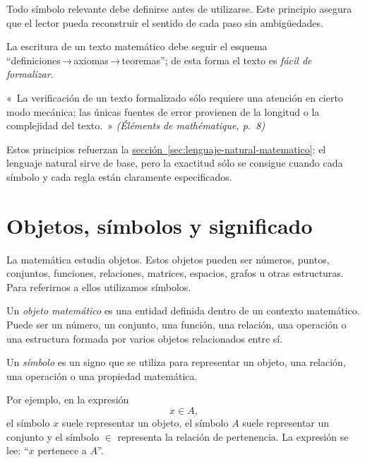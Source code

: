 \begin{convencion}
  Todo símbolo relevante debe definirse antes de utilizarse.
  Este principio asegura que el lector pueda reconstruir el sentido de
  cada paso sin ambigüedades.
\end{convencion}

\begin{convencion}
  La escritura de un texto matemático debe seguir el esquema
  ``definiciones → axiomas → teoremas''; de esta forma el texto es
  \emph{fácil de formalizar}.
\end{convencion}

\begin{cita}
  « La verificación de un texto formalizado sólo requiere una atención en
  cierto modo mecánica; las únicas fuentes de error provienen de la
  longitud o la complejidad del texto. » 
  \hfill \textit{(Éléments de mathématique, p.~8)}
\end{cita}

Estos principios refuerzan la \hyperref[sec:lenguaje-natural-matematico]{sección~\ref*{sec:lenguaje-natural-matematico}}:
el lenguaje natural sirve de base, pero la exactitud sólo se consigue
cuando cada símbolo y cada regla están claramente especificados.


\section{Objetos, símbolos y significado}
\label{sec:objetos-simbolos-significado}

La matemática estudia objetos. Estos objetos pueden ser números, puntos, conjuntos, funciones, relaciones, matrices, espacios, grafos u otras estructuras. Para referirnos a ellos utilizamos símbolos.

\begin{definicion}
Un \emph{objeto matemático} es una entidad definida dentro de un contexto matemático. Puede ser un número, un conjunto, una función, una relación, una operación o una estructura formada por varios objetos relacionados entre sí.
\end{definicion}

\begin{definicion}[Símbolo]
Un \emph{símbolo} es un signo que se utiliza para representar un objeto, una relación, una operación o una propiedad matemática.
\end{definicion}

Por ejemplo, en la expresión
\[
  x \in A,
\]
el símbolo \(x\) suele representar un objeto, el símbolo \(A\) suele representar un conjunto y el símbolo \(\in\) representa la relación de pertenencia. La expresión se lee: ``\(x\) pertenece a \(A\)''.

